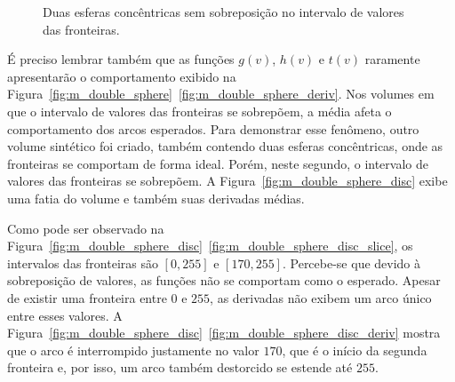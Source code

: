 \begin{figure}[h]
{		\label{fig:m_double_sphere_tf_right}
	}
	\caption{Duas esferas concêntricas sem sobreposição no intervalo de valores das fronteiras.}
	\label{fig:m_double_sphere_tf}
\end{figure}

	É preciso lembrar também que as funções $ g(v) $, $ h(v) $ e $ t(v) $ raramente apresentarão o comportamento exibido na Figura~\ref{fig:m_double_sphere}~\ref{fig:m_double_sphere_deriv}. Nos volumes em que o intervalo de valores das fronteiras se sobrepõem, a média afeta o comportamento dos arcos esperados. Para demonstrar esse fenômeno, outro volume sintético foi criado, também contendo duas esferas concêntricas, onde as fronteiras se comportam de forma ideal. Porém, neste segundo, o intervalo de valores das fronteiras se sobrepõem. A Figura~\ref{fig:m_double_sphere_disc} exibe uma fatia do volume e também suas derivadas médias.
	
	Como pode ser observado na Figura~\ref{fig:m_double_sphere_disc}~\ref{fig:m_double_sphere_disc_slice}, os intervalos das fronteiras são $ [0,255] $ e $ [170,255] $. Percebe-se que devido à sobreposição de valores, as funções não se comportam como o esperado. Apesar de existir uma fronteira entre $ 0 $ e $ 255 $, as derivadas não exibem um arco único entre esses valores. A Figura~\ref{fig:m_double_sphere_disc}~\ref{fig:m_double_sphere_disc_deriv} mostra que o arco é interrompido justamente no valor $ 170 $, que é o início da segunda fronteira e, por isso, um arco também destorcido se estende até $ 255 $.	
	

